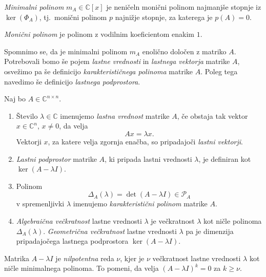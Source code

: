 \documentclass[mat1]{fmfdelo}
\newcommand{\C}{\mathbb C}
\begin{document}
\begin{definicija}
    \emph{Minimalni polinom} $m_A \in \C[x]$ je neničeln monični polinom najmanjše stopnje iz $\ker\left(\Phi_A\right)$, tj.\ monični polinom $p$ najnižje stopnje, za katerega je $p(A) = 0$.
\end{definicija}
\begin{opomba}
    \emph{Monični polinom} je polinom z vodilnim koeficientom enakim $1$.
\end{opomba}
Spomnimo se, da je minimalni polinom $m_A$ enolično določen z matriko $A$. Potrebovali bomo še pojem \emph{lastne vrednosti} in \emph{lastnega vektorja} matrike $A$, osvežimo pa še definicijo \emph{karakterističnega polinoma} matrike $A$. Poleg tega navedimo še definicijo \emph{lastnega podprostora}.
\begin{definicija}
    Naj bo $A \in \C^{n\times n}$.
    \begin{enumerate}
        \item Število $\lambda \in \C$ imenujemo \emph{lastna vrednost} matrike $A$, če obstaja tak vektor $x \in \C^n$, $x \neq 0$, da velja
        \begin{equation*}
            Ax = \lambda x.
        \end{equation*}
        Vektorji $x$, za katere velja zgornja enačba, so pripadajoči \emph{lastni vektorji}.
        \item \emph{Lastni podprostor} matrike $A$, ki pripada lastni vrednosti $\lambda$, je definiran kot $\ker \left(A - \lambda I\right)$.
        \item Polinom
        \begin{equation*}
            \Delta_A(\lambda) = \det \left(A - \lambda I\right) \in \mathcal{P}_A
        \end{equation*}
        v spremenljivki $\lambda$ imenujemo \emph{karakteristični polinom} matrike $A$.
        \item \emph{Algebraična večkratnost} lastne vrednosti $\lambda$ je večkratnost $\lambda$ kot ničle polinoma $\Delta_A\left(\lambda\right)$. \emph{Geometrična večkratnost} lastne vrednosti $\lambda$ pa je dimenzija pripadajočega lastnega podprostora $\ker \left(A - \lambda I\right)$.
    \end{enumerate}
\end{definicija}
Matrika $A - \lambda I$ je \emph{nilpotentna} reda $\nu$, kjer je $\nu$ večkratnost lastne vrednosti $\lambda$ kot ničle minimalnega polinoma. To pomeni, da velja $\left(A - \lambda I\right)^k = 0$ za $k \geq \nu$.
\end{document}
